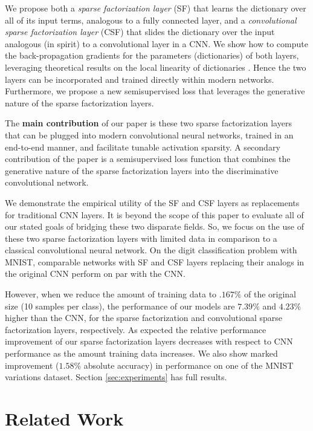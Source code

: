 \documentclass[10pt,twocolumn,letterpaper]{article}
\begin{document}
We propose both a 
\textit{sparse factorization layer} (SF) that learns the dictionary over all of 
its input terms, analogous to a fully connected layer, and a 
\textit{convolutional sparse factorization layer} (CSF) that slides the 
dictionary over the input analogous (in spirit) to a convolutional layer in a 
CNN.  We show how to compute the back-propagation gradients for the parameters 
(dictionaries) of both layers, leveraging theoretical results on the local 
linearity of dictionaries \cite{MaBaPoTPAMI2012}.  Hence the two layers can be 
incorporated and trained directly within modern networks.  Furthermore, we 
propose a new semisupervised loss that leverages the generative nature of the sparse factorization layers. 

The \textbf{main contribution} of our paper is these two sparse factorization layers that can be plugged into modern convolutional neural networks, trained in an end-to-end manner, and facilitate tunable activation sparsity.  A secondary contribution of the paper is a semisupervised loss function that combines the generative nature of the sparse factorization layers into the discriminative convolutional network.

We demonstrate the empirical utility of the SF and CSF layers as replacements for traditional CNN layers.   
%
It is beyond the scope of this paper to evaluate all of our stated goals of bridging these two disparate fields.  So, we focus on the use of these two sparse factorization layers with limited data in comparison to a classical convolutional neural network.  On the digit classification problem with MNIST, comparable networks with SF and CSF layers replacing their analogs in the original CNN perform on par with the CNN.  

However, when we reduce the amount of training data to $.167\%$ of the original size (10 samples per class), the performance of our models are $7.39\%$ and $4.23\%$ higher than the CNN, for the sparse factorization and convolutional sparse factorization layers, respectively.  As expected the relative performance improvement of our sparse factorization layers decreases with respect to CNN performance as the amount training data increases.  We also show marked improvement ($1.58\%$ absolute accuracy) in performance on one of the MNIST variations dataset.  Section \ref{sec:experiments} has full results.




\section{Related Work}
\label{sec:related}
\end{document}
